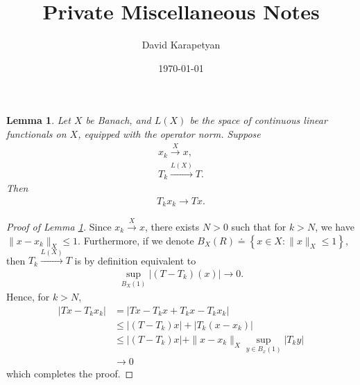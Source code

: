 \documentclass[12pt,reqno]{amsart}
\numberwithin{equation}{section}  %
\newtheorem{lemma}[theorem]{Lemma}
\begin{document}
\title{Private Miscellaneous Notes}
\author{David Karapetyan}
\address{Department of Mathematics  \\
    University  of Notre Dame\\
        Notre Dame, IN 46556 }
        \date{\today}
        \maketitle
        \section{}
        \label{sec:ll}
        
\begin{lemma}
Let $X$ be Banach, and $L(X)$ be the space of continuous linear functionals on
$X$, equipped with the operator norm. Suppose 
%
%
\begin{gather*}
  x_{k} \xrightarrow{X} x,
  \\
  T_{k} \xrightarrow{L(X)} T.
\end{gather*}
%
%
Then
\begin{gather*}
  T_{k} x_{k} \to Tx.
\end{gather*}
%
\label{lem:diag}
\end{lemma}
%
%
\begin{proof}[Proof of Lemma \ref{lem:diag}]
  Since $x_{k} \xrightarrow{X} x$, there exists $N > 0$ such that for $k > N$,
  we have $\|x -x_{k} \|_{X} \le 1$. Furthermore, if we denote $B_{X}(R) \doteq
  \left\{ x \in X: \| x \|_{X} \le 1 \right\}$, then $T_{k}
  \xrightarrow{L(X)} T$ is by definition equivalent to 
  \begin{equation*}
  \begin{split}
    \sup_{B_{X}(1)}  | (T - T_{k})(x) | \to 0.
  \end{split}
  \end{equation*}
  Hence, for $k > N$, 
  \begin{equation*}
  \begin{split}
    | Tx - T_{k}x_{k} |
    & = | Tx - T_{k}x + T_{k}x - T_{k}x_{k} |
    \\
    & \le | (T - T_{k})x | + | T_{k}(x -x_{k}) |
    \\
    & \le | (T - T_{k})x |
    + \| x - x_{k}\|_{X} \sup_{y \in B_{x}(1)} | T_{k}y |
    \\
    & \to 0
  \end{split}
  \end{equation*}
  which completes the proof.
\end{proof}




        
\end{document}
